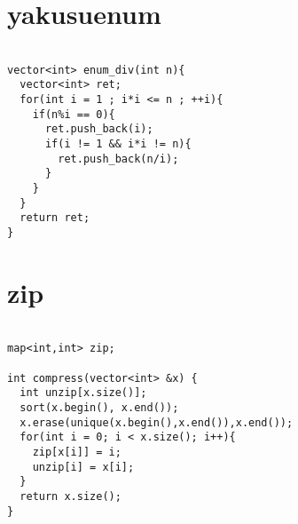 \documentclass[a4j,titlepage]{jarticle} %
\begin{document}
\color{white}
\section{yakusuenum}
\color{black}
\begin{lstlisting}[caption=yakusuenum]

vector<int> enum_div(int n){
  vector<int> ret;
  for(int i = 1 ; i*i <= n ; ++i){
    if(n%i == 0){
      ret.push_back(i);
      if(i != 1 && i*i != n){
        ret.push_back(n/i);
      }
    }
  }
  return ret;
}

\end{lstlisting}

\color{white}
\section{zip}
\color{black}
\begin{lstlisting}[caption=zip]

map<int,int> zip;

int compress(vector<int> &x) {
  int unzip[x.size()];
  sort(x.begin(), x.end());
  x.erase(unique(x.begin(),x.end()),x.end());
  for(int i = 0; i < x.size(); i++){
    zip[x[i]] = i;
    unzip[i] = x[i];
  }
  return x.size();
}

\end{lstlisting}
\end{document}
